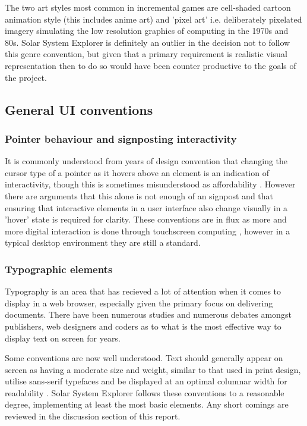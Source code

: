 \documentclass[twoside]{bhamthesis}
\begin{document}
The two art styles most common in incremental games are cell-shaded cartoon animation style (this includes anime art) and 'pixel art' i.e. deliberately pixelated imagery simulating the low resolution graphics of computing in the 1970s and 80s. Solar System Explorer is definitely an outlier in the decision not to follow this genre convention, but given that a primary requirement is realistic visual representation then to do so would have been counter productive to the goals of the project.

\subsection{General UI conventions}

\subsubsection{Pointer behaviour and signposting interactivity}

It is commonly understood from years of design convention that changing the cursor type of a pointer as it hovers above an element is an indication of interactivity, though this is sometimes misunderstood as affordability \cite{norman_affordance_1999}. However there are arguments that this alone is not enough of an signpost and that ensuring that interactive elements in a user interface also change visually in a 'hover' state is required for clarity. These conventions are in flux as more and more digital interaction is done through touchscreen computing \cite{inostroza_usability_2012}, however in a typical desktop environment they are still a standard.

\subsubsection{Typographic elements}

Typography is an area that has recieved a lot of attention when it comes to display in a web browser, especially given the primary focus on delivering documents. There have been numerous studies and numerous debates amongst publishers, web designers and coders as to what is the most effective way to display text on screen for years.

Some conventions are now well understood. Text should generally appear on screen as having a moderate size and weight, similar to that used in print design, utilise sans-serif typefaces and be displayed at an optimal columnar width for readability \cite{lupton_type_2014}. Solar System Explorer follows these conventions to a reasonable degree, implementing at least the most basic elements. Any short comings are reviewed in the discussion section of this report.
\end{document}
